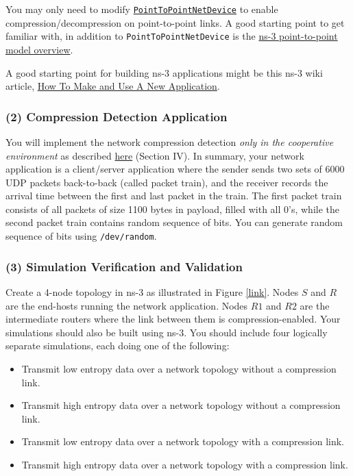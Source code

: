 \documentclass[10pt]{article}
\begin{document}
You may only need to modify \href{https://www.nsnam.org/doxygen/classns3_1_1_point_to_point_net_device.html}{\texttt{PointToPointNetDevice}} to enable compression/decompression on point-to-point links. A good starting point to get familiar with, in addition to \texttt{PointToPointNetDevice} is the \href{https://www.nsnam.org/docs/release/3.8/doxygen/group___point_to_point_model.html}{ns-3 point-to-point model overview}.

A good starting point for building ns-3 applications might be this ns-3 wiki article, \href{https://www.nsnam.org/wiki/HOWTO_make_and_use_a_new_application}{How To Make and Use A New Application}.

\subsubsection{(2) Compression Detection Application}
You will implement the network compression detection \emph{only in the cooperative environment} as described \href{https://lasr.cs.ucla.edu/vahab/resources/compression_detection.pdf}{here} (Section IV). In summary, your network application is a client/server application where the sender sends two sets of 6000 UDP packets back-to-back (called packet train), and the receiver records the arrival time between the first and last packet in the train. The first packet train consists of all packets of size 1100 bytes in payload, filled with all 0's, while the second packet train contains random sequence of bits. You can generate random sequence of bits using \texttt{/dev/random}.

\subsubsection{(3) Simulation Verification and Validation}

Create a 4-node topology in ns-3 as illustrated in Figure \ref{link}. Nodes $S$ and $R$ are the end-hosts running the network application. Nodes $R1$ and $R2$ are the intermediate routers where the link between them is compression-enabled. Your simulations should also be built using ns-3.  You should include four logically separate simulations, each doing one of the following:
\begin{itemize}
    \item Transmit low entropy data over a network topology without a compression link.
    \item Transmit high entropy data over a network topology without a compression link.
    \item Transmit low entropy data over a network topology with a compression link.
    \item Transmit high entropy data over a network topology with a compression link.
\end{itemize}
\end{document}
